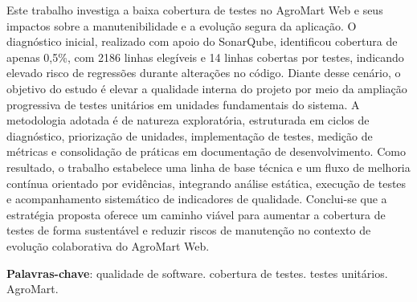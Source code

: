 \begin{resumo}
Este trabalho investiga a baixa cobertura de testes no AgroMart Web e seus impactos sobre a manutenibilidade e a evolução segura da aplicação.
O diagnóstico inicial, realizado com apoio do SonarQube, identificou cobertura de apenas 0,5\%, com 2186 linhas elegíveis e 14 linhas cobertas por testes,
indicando elevado risco de regressões durante alterações no código. Diante desse cenário, o objetivo do estudo é elevar a qualidade interna do projeto por meio
da ampliação progressiva de testes unitários em unidades fundamentais do sistema. A metodologia adotada é de natureza exploratória, estruturada em ciclos de diagnóstico,
priorização de unidades, implementação de testes, medição de métricas e consolidação de práticas em documentação de desenvolvimento.
Como resultado, o trabalho estabelece uma linha de base técnica e um fluxo de melhoria contínua orientado por evidências, integrando análise estática,
execução de testes e acompanhamento sistemático de indicadores de qualidade. Conclui-se que a estratégia proposta oferece um caminho viável para aumentar
a cobertura de testes de forma sustentável e reduzir riscos de manutenção no contexto de evolução colaborativa do AgroMart Web.

\vspace{\onelineskip}

\noindent
\textbf{Palavras-chave}: qualidade de software. cobertura de testes. testes unitários. AgroMart.
\end{resumo}

